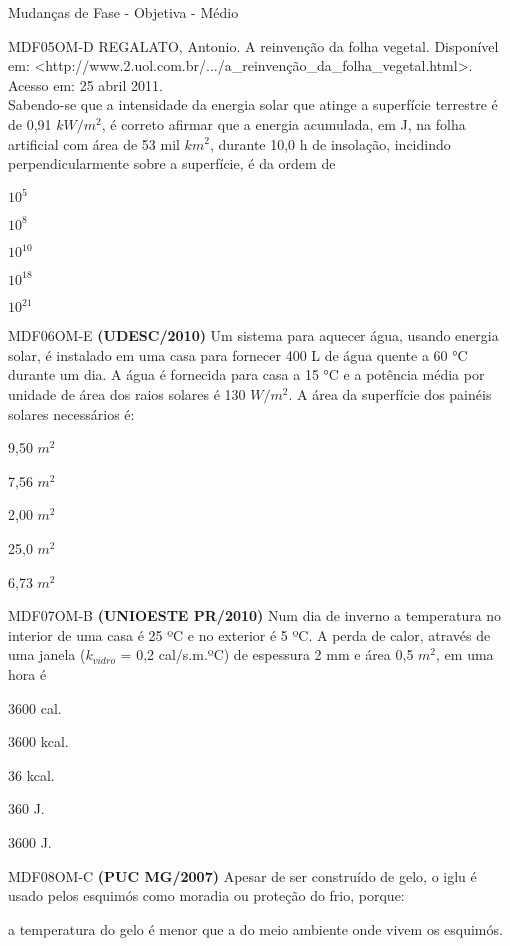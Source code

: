 \documentclass[12pt]{article}
\begin{document}
\begin{quiz}{Mudanças de Fase - Objetiva - Médio}
\begin{multi}[points=1,penalty=0]{MDF05OM-D}
			REGALATO, Antonio. A reinvenção da folha vegetal. Disponível em: <http://www.2.uol.com.br/.../a\_reinvenção\_da\_folha\_vegetal.html>. Acesso em: 25 abril 2011.\\			
			Sabendo-se que a intensidade da energia solar que atinge a superfície terrestre é de 0,91 $kW/m^{2}$, é correto afirmar que a energia acumulada, em J, na folha artificial com área de 53 mil $km^{2}$, durante 10,0 h de insolação, incidindo perpendicularmente sobre a superfície, é da ordem de						
			\item $10^{5}$
			\item $10^{8}$
			\item $10^{10}$
			\item* $10^{18}$
			\item $10^{21}$
		\end{multi}	
		\begin{multi}[points=1,penalty=0]{MDF06OM-E}
			\textbf{(UDESC/2010)} Um sistema para aquecer água, usando energia solar, é instalado em uma casa para fornecer 400 L de água quente a 60 °C durante um dia. A água é fornecida para casa a 15 °C e a potência média por unidade de área dos raios solares é 130 $W/m^{2}$. A área da superfície dos painéis solares necessários é:				
			\item 9,50 $m^{2}$
			\item 7,56 $m^{2}$
			\item 2,00 $m^{2}$
			\item 25,0 $m^{2}$
			\item* 6,73 $m^{2}$
		\end{multi}
		\begin{multi}[points=1,penalty=0]{MDF07OM-B}
			\textbf{(UNIOESTE PR/2010)} Num dia de inverno a temperatura no interior de uma casa é 25 ºC e no exterior é 5 ºC. A perda de calor, através de uma janela ($k_{vidro}$ = 0,2 cal/s.m.ºC) de espessura 2 mm e área 0,5 $m^{2}$, em uma hora é						
			\item 3600 cal.
			\item* 3600 kcal.
			\item 36 kcal.
			\item 360 J.
			\item 3600 J.
		\end{multi}
		\begin{multi}[points=1,penalty=0]{MDF08OM-C}
			\textbf{(PUC MG/2007)} Apesar de ser construído de gelo, o iglu é usado pelos esquimós como moradia ou proteção do frio, porque:									
			\item a temperatura do gelo é menor que a do meio ambiente onde vivem os esquimós.

\end{multi}
\end{quiz}
\end{document}
